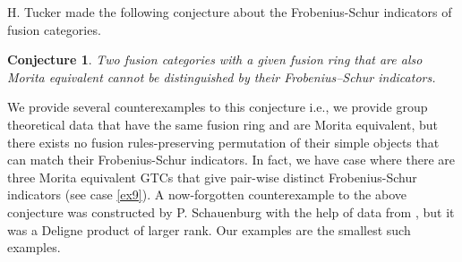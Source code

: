 \documentclass[a4paper, 10pt]{book}
\newtheorem{Conj}[theorem]{Conjecture}
\theoremstyle{definition}
\numberwithin{equation}{chapter}
\begin{document}
H. Tucker made the following conjecture \cite[Conjecture 5.6]{MR4044867} about the Frobenius-Schur indicators of fusion categories. 
\begin{Conj}\label{tucker}
Two fusion categories with a given fusion ring that are also Morita equivalent cannot be distinguished by their Frobenius–Schur indicators.
 \end{Conj} 
We provide several counterexamples to this conjecture i.e., we provide  group theoretical data that have the same fusion ring and are Morita equivalent, but there exists no fusion rules-preserving permutation of their simple objects that can match their Frobenius-Schur indicators. In fact, we have case where there are three Morita equivalent GTCs that give pair-wise distinct Frobenius-Schur indicators (see case \ref{ex9}). A now-forgotten counterexample to the above conjecture was constructed by P. Schauenburg with the help of data from \cite{2017arXiv170806538M}, but it was a Deligne product of larger rank. Our examples are the smallest such examples.
\end{document}

